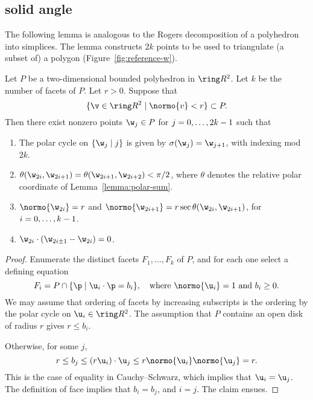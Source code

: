 \begin{cnl}
\subsection{solid angle}\label{solid angle}
%


The following lemma is analogous to the Rogers decomposition of a
polyhedron into simplices.  The lemma constructs $2k$ points to be
used to triangulate (a subset of) a polygon (Figure~\ref{fig:reference-w}).


\begin{lemma}[]

\label{lemma:2D-poly}
%
Let $P$ be a two-dimensional bounded polyhedron in $\vecR{2}$.
Let $k$ be the number of facets of $P$.  Let $r>0$.  Suppose that
\[
\setcomp{\v\in \vecR{2}}{  \normo{v}< r} \subset P.
\]
Then there exist nonzero points $\w_j\in P$
for $j=0,\ldots,2k-1$ such that
\begin{enumerate}
\item The polar cycle on  $\setcomp{\w_j}{ j}$ is given by
$\sigma(\w_j) = \w_{j+1}$, with indexing mod $2k$.
\item $\theta(\w_{2i},\w_{2i+1}) = \theta(\w_{2i+1},\w_{2i+2}) < \pi/2$,  
where $\theta$ denotes the
relative polar coordinate of Lemma~\ref{lemma:polar-sum}.
\item $\normo{\w_{2i}}=r$ and 
$\normo{\w_{2i+1}} = r\sec \theta(\w_{2i},\w_{2i+1})$, 
for $i=0,\ldots,k-1$.
\item $\w_{2i}\cdot (\w_{2i\pm1}-\w_{2i}) = 0$.
\end{enumerate}
\end{lemma}

\figYAHDBVO %

\begin{proof}
  Enumerate  the distinct facets $F_1,\ldots,F_k$ of $P$, and for each
  one select a defining equation
\[
F_i = P\cap \setcomp{\p }{ \u_i \cdot \p = b_i},
\quad\text{where } \normo{\u_i}=1\text{ and } b_i\ge0.
\]
We may assume that ordering of facets by increasing subscripts is
the ordering by the polar cycle on $\u_i\in\vecR{2}$.
The assumption that $P$ contains an open disk of radius $r$ gives
$r\le b_i$.

  Otherwise, for some $j$,
\[
r\le b_j \le (r\u_i)\cdot \u_j\le r\normo{\u_i}\normo{\u_j}=r.
\]  
This is the case of equality in Cauchy--Schwarz, which implies that
$\u_i=\u_j$.  The definition of face implies that $b_i=b_j$, and $i=j$.   
The claim ensues.


\end{proof}
\end{cnl}
